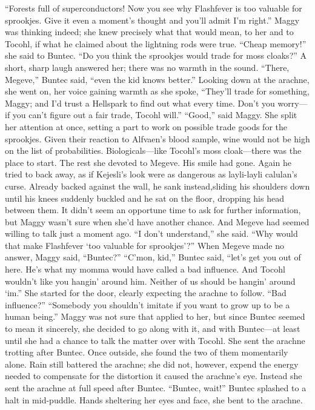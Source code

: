\documentclass[9pt]{article}
\begin{document}
“Forests full of superconductors! Now you see why Flashfever is too valuable for sprookjes. Give it even
a moment’s thought and you’ll admit I’m right.”
Maggy was thinking indeed; she knew precisely what that would mean, to her and to Tocohl, if what
he claimed about the lightning rods were true. “Cheap memory!” she said to Buntec. “Do you think the
sprookjes would trade for moss cloaks?”
A short, sharp laugh answered her; there was no warmth in the sound. “There, Megeve,” Buntec
said, “even the kid knows better.” Looking down at the arachne, she went on, her voice gaining warmth
as she spoke, “They’ll trade for something, Maggy; and I’d trust a Hellspark to find out what every time.
Don’t you worry—if you can’t figure out a fair trade, Tocohl will.”
“Good,” said Maggy. She split her attention at once, setting a part to work on possible trade goods
for the sprookjes. Given their reaction to Alfvaen’s blood sample, wine would not be high on the list of
probabilities. Biologicals—like Tocohl’s moss cloak—there was the place to start.
The rest she devoted to Megeve. His smile had gone. Again he tried to back away, as if Kejesli’s
look were as dangerous as layli-layli calulan’s curse. Already backed against the wall, he sank instead,sliding his shoulders down until his knees suddenly buckled and he sat on the floor, dropping his head
between them.
It didn’t seem an opportune time to ask for further information, but Maggy wasn’t sure when she’d
have another chance. And Megeve had seemed willing to talk just a moment ago. “I don’t understand,”
she said. “Why would that make Flashfever ‘too valuable for sprookjes’?”
When Megeve made no answer, Maggy said, “Buntec?”
“C’mon, kid,” Buntec said, “let’s get you out of here. He’s what my momma would have called a
bad influence. And Tocohl wouldn’t like you hangin’ around him. Neither of us should be hangin’ around
‘im.” She started for the door, clearly expecting the arachne to follow.
“Bad influence?”
“Somebody you shouldn’t imitate if you want to grow up to be a human being.”
Maggy was not sure that applied to her, but since Buntec seemed to mean it sincerely, she decided to
go along with it, and with Buntec—at least until she had a chance to talk the matter over with Tocohl.
She sent the arachne trotting after Buntec.
Once outside, she found the two of them momentarily alone. Rain still battered the arachne; she did
not, however, expend the energy needed to compensate for the distortion it caused the arachne’s eye.
Instead she sent the arachne at full speed after Buntec. “Buntec, wait!”
Buntec splashed to a halt in mid-puddle. Hands sheltering her eyes and face, she bent to the arachne.
\end{document}
